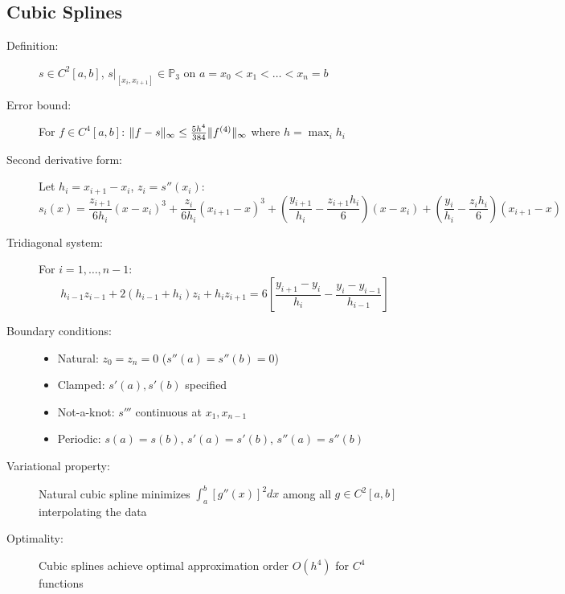 \documentclass[a4paper,10pt,landscape]{article}
\DeclarePairedDelimiter{\norm}{\lVert}{\rVert}
\begin{document}
\begin{multicols*}{3}
    \subsection*{Cubic Splines}
    \begin{description}
        \item[Definition:] $s \in C^{2}[a,b]$, $s|_{[x_i,x_{i+1}]} \in \mathbb{P}_3$ on $a=x_0 < x_1 < \ldots < x_n=b$
        \item[Error bound:] For $f \in C^4[a,b]$: $\norm{f - s}_\infty \leq \frac{5h^4}{384}\norm{f^{(4)}}_\infty$ where $h = \max_i h_i$
        \item[Second derivative form:] Let $h_i=x_{i+1}-x_i$, $z_i=s''(x_i)$:
              \[s_i(x) = \frac{z_{i+1}}{6h_i}(x-x_i)^3 + \frac{z_i}{6h_i}(x_{i+1}-x)^3 + \left(\frac{y_{i+1}}{h_i} - \frac{z_{i+1}h_i}{6}\right)(x-x_i) + \left(\frac{y_i}{h_i} - \frac{z_ih_i}{6}\right)(x_{i+1}-x)\]
        \item[Tridiagonal system:] For $i=1,\ldots,n-1$:
              \[h_{i-1}z_{i-1} + 2(h_{i-1}+h_i)z_i + h_iz_{i+1} = 6\left[\frac{y_{i+1}-y_i}{h_i} - \frac{y_i-y_{i-1}}{h_{i-1}}\right]\]
        \item[Boundary conditions:]
              \begin{itemize}
                  \item Natural: $z_0=z_n=0$ ($s''(a)=s''(b)=0$)
                  \item Clamped: $s'(a), s'(b)$ specified
                  \item Not-a-knot: $s'''$ continuous at $x_1,x_{n-1}$
                  \item Periodic: $s(a)=s(b)$, $s'(a)=s'(b)$, $s''(a)=s''(b)$
              \end{itemize}
        \item[Variational property:] Natural cubic spline minimizes $\int_a^b [g''(x)]^2 dx$ among all $g \in C^2[a,b]$ interpolating the data
        \item[Optimality:] Cubic splines achieve optimal approximation order $O(h^4)$ for $C^4$ functions
    \end{description}


\end{multicols*}
\end{document}
